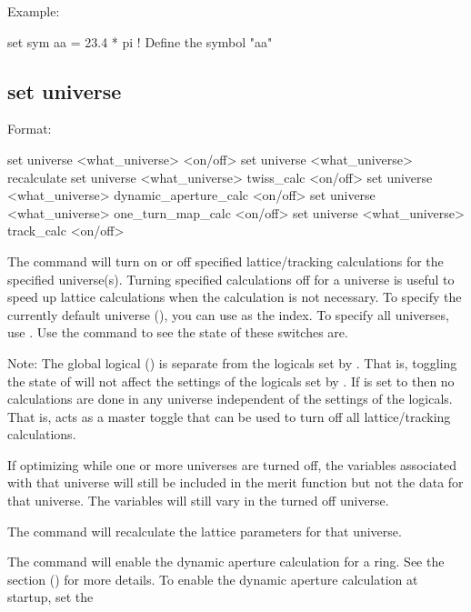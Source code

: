 {{{{{Example:
\begin{example}
  set sym aa = 23.4 * pi  ! Define the symbol "aa"
\end{example}


\subsection{set universe}
\label{s:set.universe}

Format:
\begin{example}
  set universe <what_universe> <on/off>
  set universe <what_universe> recalculate
  set universe <what_universe> twiss_calc <on/off>
  set universe <what_universe> dynamic_aperture_calc <on/off>
  set universe <what_universe> one_turn_map_calc <on/off>
  set universe <what_universe> track_calc <on/off>
\end{example}

The  command will turn on or off specified lattice/tracking
calculations for the specified universe(s). Turning specified calculations off for a universe is
useful to speed up lattice calculations when the calculation is not necessary. To specify the
currently default universe (), you can use  as the 
index. To specify all universes, use \vn{*}. Use the  command to see the state of
these switches are.

Note: The global logical  () is separate from the logicals set
by . That is, toggling the state of  will not affect the
settings of the logicals set by . If  is set to  then
no calculations are done in any universe independent of the settings of the 
logicals. That is,  acts as a master toggle that can be used to turn off all
lattice/tracking calculations.

If optimizing while one or more universes are turned off, the variables associated with that
universe will still be included in the merit function but not the data for that universe. The
variables will still vary in the turned off universe.

The  command will recalculate the lattice
parameters for that universe.

The  command will enable the dynamic aperture
calculation for a ring. See the  section
() for more details. To enable the dynamic aperture calculation at startup,
set the \vn{design_lattice(i)%

}}}}}}
